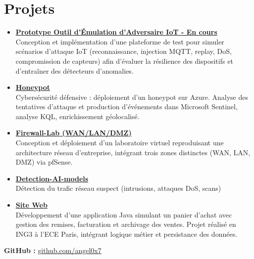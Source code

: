 \documentclass[a4paper,10pt]{article}
\begin{document}
\section*{Projets}


\begin{itemize}[leftmargin=*]


\item \href{https://github.com/angel0x7/IoT-Adversary-Emulator}{\textbf{Prototype Outil d'Émulation d'Adversaire IoT - En cours}} \\
Conception et implémentation d'une plateforme de test pour simuler scénarios d'attaque IoT (reconnaissance, injection MQTT, replay, DoS, compromission de capteurs) afin d'évaluer la résilience des dispositifs et d'entraîner des détecteurs d'anomalies.



  \item \href{https://github.com/angel0x7/Honeypot-}{\textbf{Honeypot}} \\
  Cybersécurité défensive : déploiement d’un honeypot sur Azure. Analyse des tentatives d’attaque et production d’événements dans Microsoft Sentinel, analyse KQL, enrichissement géolocalisé.

  \item \href{https://github.com/angel0x7/Firewall-Lab-WAN-LAN-DMZ-}{\textbf{Firewall-Lab (WAN/LAN/DMZ)}} \\
  Conception et déploiement d’un laboratoire virtuel reproduisant une architecture réseau d’entreprise, intégrant trois zones distinctes (WAN, LAN, DMZ) via pfSense.
  \item \href{https://github.com/angel0x7/Detection-AI-models-}{\textbf{Detection-AI-models}} \\
  Détection du trafic réseau suspect (intrusions, attaques DoS, scans)
  \item \href{https://github.com/angel0x7/Web_site_java}{\textbf{Site Web}} \\
Développement d’une application Java simulant un panier d’achat avec gestion des remises, facturation et archivage des ventes. Projet réalisé en ING3 à l’ECE Paris, intégrant logique métier et persistance des données.



\end{itemize}

\noindent
\textbf{GitHub :} \href{https://github.com/angel0x7}{github.com/angel0x7}


\end{document}
